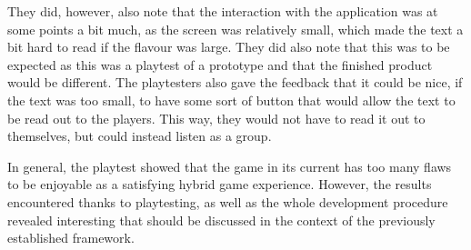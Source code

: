 They did, however, also note that the interaction with the application was at some points a bit much, as the screen was relatively small, which made the text a bit hard to read if the flavour was large. They did also note that this was to be expected as this was a playtest of a prototype and that the finished product would be different. The playtesters also gave the feedback that it could be nice, if the text was too small, to have some sort of button that would allow the text to be read out to the players. This way, they would not have to read it out to themselves, but could instead listen as a group.


In general, the playtest showed that the game in its current has too many flaws to be enjoyable as a satisfying hybrid game experience. However, the results encountered thanks to playtesting, as well as the whole development procedure revealed interesting that should be discussed in the context of the previously established framework.